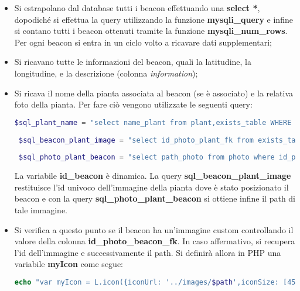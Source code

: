 \begin{itemize}
\item Si estrapolano dal database tutti i beacon effettuando una \textbf{ select *}, dopodiché si effettua la query utilizzando la funzione \textbf{mysqli\_query} e infine si contano tutti i beacon ottenuti tramite la funzione \textbf{mysqli\_num\_rows}. \newline Per ogni beacon si entra in un ciclo volto a ricavare dati supplementari;
\item Si ricavano tutte le informazioni del beacon, quali la latitudine, la longitudine, e la descrizione (colonna \textit{information});
\item Si ricava il nome della pianta associata al beacon (se è associato) e la relativa foto della pianta. \newline Per fare ciò vengono utilizzate le seguenti query: 
\begin{lstlisting}[language=PHP]
 $sql_plant_name = "select name_plant from plant,exists_table WHERE plant.id_plant = exists_table.id_plant_fk AND exists_table.id_beacon_fk = '".$id_beacon."' ;";
 
 $sql_beacon_plant_image = "select id_photo_plant_fk from exists_table where id_beacon_fk = '".$id_beacon."';";
 
 $sql_photo_plant_beacon = "select path_photo from photo where id_photo = '".$result["id_photo_plant_fk"]."';";
\end{lstlisting}
La variabile \textbf{id\_beacon} è dinamica. \newline La query \textbf{sql\_beacon\_plant\_image}  restituisce l'id univoco dell'immagine della pianta dove è stato posizionato il beacon e con la query \newline \textbf{sql\_photo\_plant\_beacon} si ottiene infine il path di tale immagine.
\item Si verifica a questo punto se il beacon ha un'immagine custom controllando il valore della colonna \textbf{id\_photo\_beacon\_fk}. In caso affermativo, si recupera l'id dell'immagine e successivamente il path. \newline
Si definirà allora in PHP una variabile \textbf{myIcon} come segue:
\begin{lstlisting}[language=PHP]
 echo "var myIcon = L.icon({iconUrl: '../images/$path',iconSize: [45, 95]";
\end{lstlisting}



\end{itemize}
